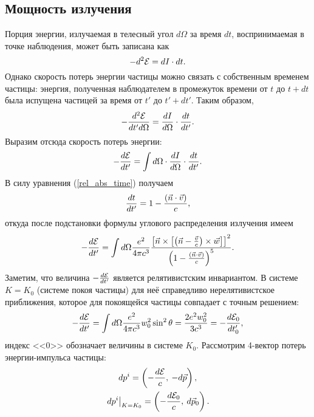 \subsection{Мощность излучения}
    Порция энергии, излучаемая в телесный угол $d\Omega$ за время $dt$, воспринимаемая в точке наблюдения, может быть записана как
    \begin{equation*}
        -d^2\mathcal{E} = dI \cdot dt.
    \end{equation*}
    Однако скорость потерь энергии частицы можно связать с собственным временем частицы: энергия, полученная наблюдателем в промежуток времени от $t$ до $t + dt$ была
    испущена частицей за время от $t'$ до $t' + dt'$. Таким образом,
    \begin{equation*}
        -\frac{d^2\mathcal{E}}{dt'd\Omega} = \frac{dI}{d\Omega} \cdot \frac{dt}{dt'}.
    \end{equation*}
    Выразим отсюда скорость потерь энергии:
    \begin{equation*}
        -\frac{d\mathcal{E}}{dt'} = \int d\Omega\cdot\frac{dI}{d\Omega}\cdot\frac{dt}{dt'}.
    \end{equation*}
    В силу уравнения (\ref{rel_abs_time}) получаем
    \begin{equation*}
        \frac{dt}{dt'} = 1 - \frac{\left({\vec{n}\cdot\vec{v}}\right)}{c},
    \end{equation*}
    откуда после подстановки формулы углового распределения излучения имеем
    \begin{equation*}
        -\frac{d\mathcal{E}}{dt'} = \int d\Omega \frac{e^2}{4\pi c^3} \frac{\left[{\vec{n} \times \left[{\left({\vec{n} - \frac{\vec{v}}{c}}\right) \times \vec{w}}\right]}\right]^2}
        {\left({1 - \frac{\left({\vec{n}\cdot\vec{v}}\right)}{c}}\right)^5}.
    \end{equation*}
    Заметим, что величина $-\frac{d\mathcal{E}}{dt'}$ является релятивистским инвариантом. В системе $K = K_0$ (системе покоя частицы) для неё справедливо нерелятивистское
    приближения, которое для покоящейся частицы совпадает с точным решением:
    \begin{equation}
        - \frac{d\mathcal{E}}{dt'} = \int d\Omega \frac{e^2}{4\pi c^3} w_0^2\sin^2\theta = \frac{2e^2w_0^2}{3c^3} = - \frac{d\mathcal{E}_0}{dt_0'}, \label{rel_rad_self}
    \end{equation}
    индекс <<$0$>> обозначает величины в системе $K_0$. Рассмотрим 4-вектор потерь энергии-импульса частицы:
    \begin{gather*}
        dp^i = \left({-\frac{d\mathcal{E}}{c},\: -d\vec{p}}\right), \\
        \left. dp^i \right|_{K = K_0} = \left({-\frac{d\mathcal{E}_0}{c},\: d\vec{p}_0}\right).
    \end{gather*} 
